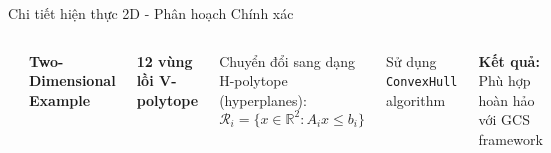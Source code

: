 \documentclass[aspectratio=169]{beamer}
\begin{document}
\begin{frame}{Chi tiết hiện thực 2D - Phân hoạch Chính xác}
    \begin{columns}[c]
        \includegraphics[width=\textwidth]{../imgs/2d-decompose.png}

        \textbf{Two-Dimensional Example}
        
        \textbf{12 vùng lồi V-polytope}

        \vspace{0.3cm}
        Chuyển đổi sang dạng H-polytope (hyperplanes):
        \[
            \mathcal{R}_i = \{x \in \mathbb{R}^2 : A_i x \leq b_i\}
        \]

        \vspace{0.3cm}
        Sử dụng \texttt{ConvexHull} algorithm

        \vspace{0.3cm}
        \textbf{Kết quả:} Phù hợp hoàn hảo với GCS framework
    \end{columns}
\end{frame}
\end{document}
